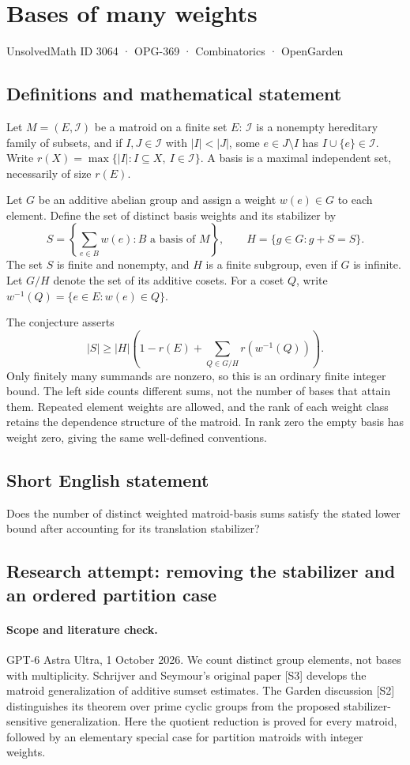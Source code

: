 \documentclass[11pt,a4paper]{article}
\begin{document}
\section*{Bases of many weights}\label{3064}
{\small UnsolvedMath ID 3064 · OPG-369 · Combinatorics · OpenGarden}
\subsection{Definitions and mathematical statement}
Let $M=(E,\mathcal I)$ be a matroid on a finite set $E$: $\mathcal I$ is
a nonempty hereditary family of subsets, and if $I,J\in\mathcal I$ with
$|I|<|J|$, some $e\in J\setminus I$ has $I\cup\{e\}\in\mathcal I$.
Write $r(X)=\max\{|I|:I\subseteq X,\ I\in\mathcal I\}$.
A basis is a maximal independent set, necessarily of size $r(E)$.

Let $G$ be an additive abelian group and assign a weight $w(e)\in G$
to each element. Define the set of distinct basis weights and its stabilizer by
\[
 S=\left\{\sum_{e\in B}w(e):B\text{ a basis of }M\right\},\qquad
 H=\{g\in G:g+S=S\}.
\]
The set $S$ is finite and nonempty, and $H$ is a finite subgroup, even
if $G$ is infinite. Let $G/H$ denote the set of its additive cosets.
For a coset $Q$, write $w^{-1}(Q)=\{e\in E:w(e)\in Q\}$.

The conjecture asserts
\[
 |S|\ge |H|\left(1-r(E)+
                 \sum_{Q\in G/H}r(w^{-1}(Q))\right).
\]
Only finitely many summands are nonzero, so this is an ordinary finite
integer bound. The left side counts different sums, not the number of
bases that attain them. Repeated element weights are allowed, and the
rank of each weight class retains the dependence structure of the
matroid. In rank zero the empty basis has weight zero, giving the same
well-defined conventions.
\subsection{Short English statement}
Does the number of distinct weighted matroid-basis sums satisfy the stated lower bound after accounting for its translation stabilizer?
\subsection{Research attempt: removing the stabilizer and an ordered partition case}
\paragraph{Scope and literature check.}
GPT-6 Astra Ultra, 1 October 2026. We count distinct group elements,
not bases with multiplicity. Schrijver and Seymour's original paper
[S3] develops the matroid generalization of additive sumset estimates.
The Garden discussion [S2] distinguishes its theorem over prime cyclic
groups from the proposed stabilizer-sensitive generalization. Here the
quotient reduction is proved for every matroid, followed by an elementary
special case for partition matroids with integer weights.
\end{document}
